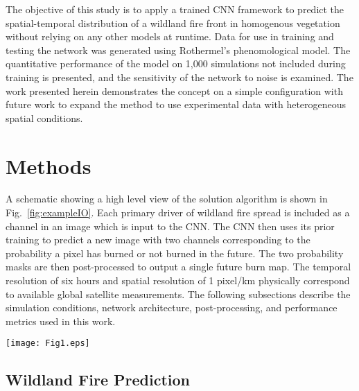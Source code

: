 \documentclass[smallcondensed]{svjour3}     %
\begin{document}
The objective of this study is to apply a trained CNN framework to predict the
spatial-temporal distribution of a wildland fire front in homogenous vegetation
without relying on any other models at runtime. Data for use in
training and testing the network was generated using Rothermel's phenomological
model. The quantitative performance of the model on 1,000 simulations not included
during training is presented, and
the sensitivity of the network to noise is examined.
The work presented herein demonstrates the concept
on a simple configuration with future work to expand the method to use
experimental data with heterogeneous spatial conditions.

\section{Methods}
\label{s:Methods}

A schematic showing a high level view of the solution algorithm is shown
in Fig.~\ref{fig:exampleIO}.
Each primary driver of wildland fire spread is included as a channel in an
image which is input to the CNN.
The CNN then uses its prior training to predict a new image with two channels
corresponding to the probability a pixel has burned or not burned in the future.
The two probability masks are then post-processed to output a single future
burn map. The temporal resolution of six hours and spatial resolution of 1 pixel/km
physically correspond to available global satellite measurements.
The following subsections describe the simulation conditions, network architecture,
post-processing, and performance metrics used in this work.

\begin{figure*}[htb]
  \texttt{[image: Fig1.eps]}
\caption{Schematic of solution algorithm. The left set of images show the
different channels used as inputs to the neural network. The values for each
data channel are colorized based on the values shown in
Table~\ref{tab:paramsLimits} and Table~\ref{tab:paramsExample}.}
\label{fig:exampleIO}       %
\end{figure*}



\subsection{Wildland Fire Prediction}
\label{ss:Wfp}
\end{document}
